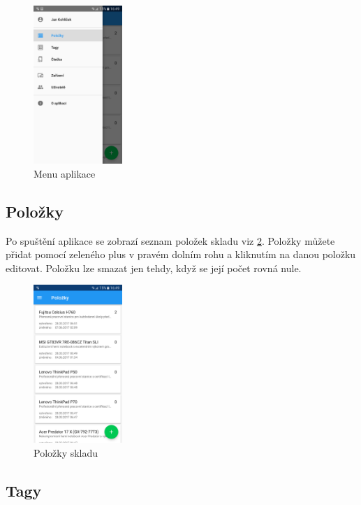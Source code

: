 \documentclass[czech,BP]{thesiskiv}
\begin{document}
\begin{figure}[h]
	\centering
	\includegraphics[width=0.3\textwidth]{../images/client_android/Screenshot_20170607-164924.png}	
	\caption{Menu aplikace}
	\label{fig:Screenshot_20170607-164924}
\end{figure}


\subsection{Položky}	

Po spuštění aplikace se zobrazí seznam položek skladu viz \ref{fig:Screenshot_20170607-164919}.
Položky můžete přidat pomocí zeleného plus v pravém dolním rohu a kliknutím na danou položku editovat.
Položku lze smazat jen tehdy, když se její počet rovná nule.

\begin{figure}[h]
	\centering
	\includegraphics[width=0.3\textwidth]{../images/client_android/Screenshot_20170607-164919.png}	
	\caption{Položky skladu}
	\label{fig:Screenshot_20170607-164919}
\end{figure}

\subsection{Tagy}
\end{document}
